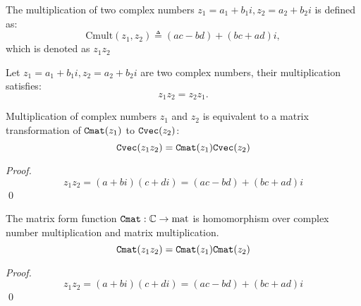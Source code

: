 \documentclass[runningheads,a4paper,english]{llncs}[2022/01/12]
\newcommand{\bC}{\mathbb{C}}
\begin{document}
\begin{definition}
  The multiplication of two complex numbers $z_1=a_1+b_1i, z_2=a_2+b_2i$ is defined as:
  \begin{equation}\label{complex_mult_alg}
    \mathrm{Cmult}(z_1,z_2)\triangleq (ac-bd)+(bc+ad)i,
  \end{equation}
  which is denoted as $z_1z_2$
\end{definition}

\begin{lemma}
  Let $z_1=a_1+b_1i, z_2=a_2+b_2i$ are two complex numbers, their multiplication satisfies:
  \begin{equation}
    z_1z_2=z_2z_1.
  \end{equation}
\end{lemma}

\begin{lemma}
  Multiplication of complex numbers $z_1$ and $z_2$ is equivalent to a matrix transformation of $\Cmat(z_1)$ to $\Cvec(z_2)$:
  \begin{equation}
    \Cvec{z_1z_2}=\Cmat{z_1}\Cvec{z_2}
  \end{equation}
\end{lemma}
\begin{proof}
  \begin{equation*}
    z_1z_2= (a+bi)(c+di)=(ac-bd)+(bc+ad)i
  \end{equation*}
  \qed
\end{proof}

\begin{lemma}
  The matrix form function $\Cmat:\bC\rightarrow \mathrm{mat}$ is homomorphism over complex number multiplication and matrix multiplication.
  \begin{equation}
    \Cmat{z_1z_2}=\Cmat{z_1}\Cmat{z_2}
  \end{equation}
\end{lemma}
\begin{proof}
  \begin{equation*}
    z_1z_2= (a+bi)(c+di)=(ac-bd)+(bc+ad)i
  \end{equation*}
  \qed
\end{proof}
\end{document}
